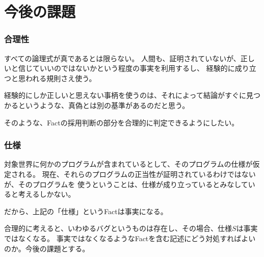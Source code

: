 \documentclass[10pt, onecolumn]{jarticle}   	%
\begin{document}
\section{今後の課題}
\subsubsection{合理性}
すべての論理式が真であるとは限らない。
人間も、証明されていないが、正しいと信じていいのではないかという程度の事実を利用するし、
経験的に成り立つと思われる規則さえ使う。

経験的にしか正しいと思えない事柄を使うのは、それによって結論がすぐに見つかるというような、真偽とは別の基準があるのだと思う。

そのような、Factの採用判断の部分を合理的に判定できるようにしたい。

\subsubsection{仕様}
対象世界に何かのプログラムが含まれているとして、そのプログラムの仕様が仮定される。
現在、それらのプログラムの正当性が証明されているわけではないが、そのプログラムを
使うということは、仕様が成り立っているとみなしていると考えるしかない。

だから、上記の「仕様」というFactは事実になる。

合理的に考えると、いわゆるバグというものは存在し、その場合、仕様$S$は事実ではなくなる。
事実ではなくなるようなFactを含む記述にどう対処すればよいのか。今後の課題とする。
\end{document}
